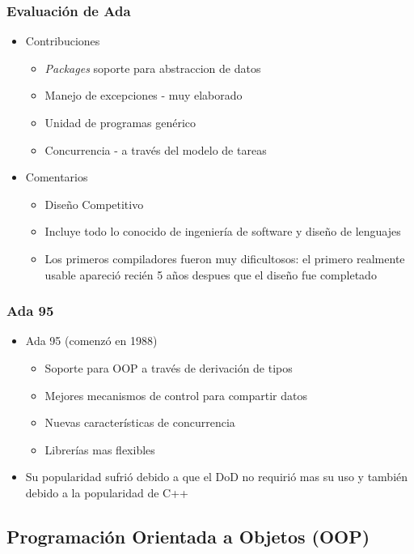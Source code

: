 \documentclass[11pt]{article}
\begin{document}
\subsubsection*{Evaluación de Ada}
\label{sec:orgheadline92}
\begin{itemize}
\item Contribuciones
\begin{itemize}
\item \emph{Packages} soporte para abstraccion de datos
\item Manejo de excepciones - muy elaborado
\item Unidad de programas genérico
\item Concurrencia - a través del modelo de tareas
\end{itemize}
\item Comentarios
\begin{itemize}
\item Diseño Competitivo
\item Incluye todo lo conocido de ingeniería de software y diseño de lenguajes
\item Los primeros compiladores fueron muy dificultosos: el primero
realmente usable apareció recién 5 años despues que el diseño fue
completado
\end{itemize}
\end{itemize}

\subsubsection*{Ada 95}
\label{sec:orgheadline93}
\begin{itemize}
\item Ada 95 (comenzó en 1988)
\begin{itemize}
\item Soporte para OOP a través de derivación de tipos
\item Mejores mecanismos de control para compartir datos
\item Nuevas características de concurrencia
\item Librerías mas flexibles
\end{itemize}
\item Su popularidad sufrió debido a que el DoD no requirió mas su uso y
también debido a la popularidad de C++
\end{itemize}

\subsection*{Programación Orientada a Objetos (OOP)}
\label{sec:orgheadline100}
\end{document}
